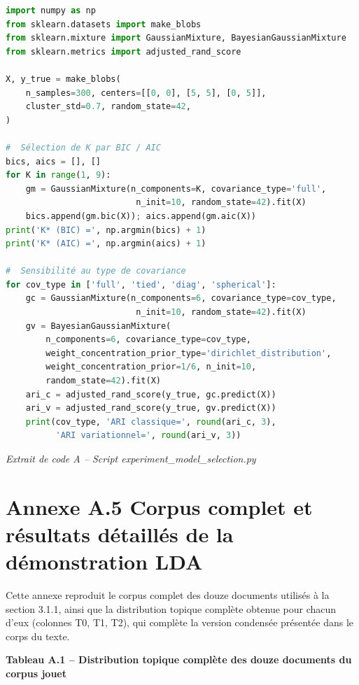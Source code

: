 \begin{lstlisting}[language=Python]
import numpy as np
from sklearn.datasets import make_blobs
from sklearn.mixture import GaussianMixture, BayesianGaussianMixture
from sklearn.metrics import adjusted_rand_score

X, y_true = make_blobs(
    n_samples=300, centers=[[0, 0], [5, 5], [0, 5]],
    cluster_std=0.7, random_state=42,
)

#  Sélection de K par BIC / AIC 
bics, aics = [], []
for K in range(1, 9):
    gm = GaussianMixture(n_components=K, covariance_type='full',
                          n_init=10, random_state=42).fit(X)
    bics.append(gm.bic(X)); aics.append(gm.aic(X))
print('K* (BIC) =', np.argmin(bics) + 1)
print('K* (AIC) =', np.argmin(aics) + 1)

#  Sensibilité au type de covariance 
for cov_type in ['full', 'tied', 'diag', 'spherical']:
    gc = GaussianMixture(n_components=6, covariance_type=cov_type,
                          n_init=10, random_state=42).fit(X)
    gv = BayesianGaussianMixture(
        n_components=6, covariance_type=cov_type,
        weight_concentration_prior_type='dirichlet_distribution',
        weight_concentration_prior=1/6, n_init=10,
        random_state=42).fit(X)
    ari_c = adjusted_rand_score(y_true, gc.predict(X))
    ari_v = adjusted_rand_score(y_true, gv.predict(X))
    print(cov_type, 'ARI classique=', round(ari_c, 3),
          'ARI variationnel=', round(ari_v, 3))
\end{lstlisting}
\begin{center}\small\emph{Extrait de code A -- Script experiment\_model\_selection.py}\end{center}
\section*{Annexe A.5  Corpus complet et résultats détaillés de la démonstration LDA}
Cette annexe reproduit le corpus complet des douze documents utilisés à la section 3.1.1, ainsi que la distribution topique complète obtenue pour chacun d'eux (colonnes T0, T1, T2), qui complète la version condensée présentée dans le corps du texte.

\textbf{Tableau A.1 -- Distribution topique complète des douze documents du corpus jouet}

